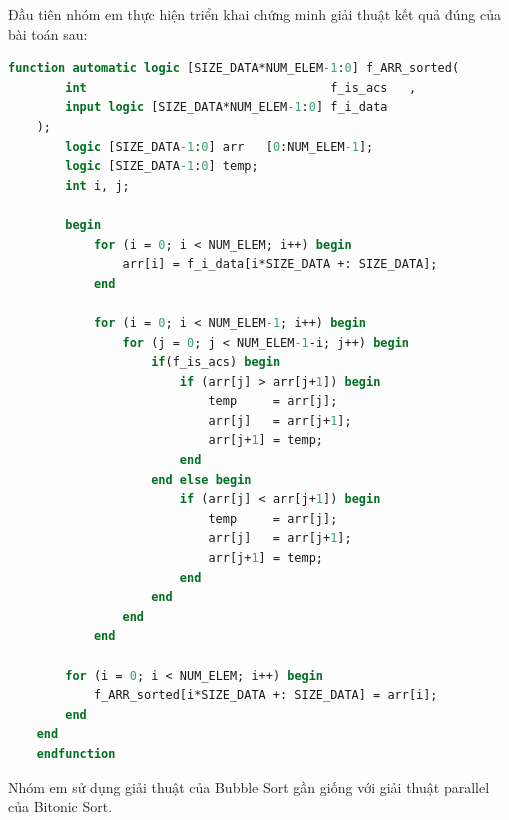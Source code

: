 
Đầu tiên nhóm em thực hiện triển khai chứng minh giải thuật kết quả đúng của bài toán sau:

\begin{lstlisting}[style=StyleCode, language=SystemVerilog, caption={Giải thuật chứng minh bộ Bitonic Sort 8 phần tử.}]
	function automatic logic [SIZE_DATA*NUM_ELEM-1:0] f_ARR_sorted(
		int                                  f_is_acs   ,
		input logic [SIZE_DATA*NUM_ELEM-1:0] f_i_data
	);
		logic [SIZE_DATA-1:0] arr   [0:NUM_ELEM-1];
		logic [SIZE_DATA-1:0] temp;
		int i, j;
	
		begin
			for (i = 0; i < NUM_ELEM; i++) begin
				arr[i] = f_i_data[i*SIZE_DATA +: SIZE_DATA];
			end
			
			for (i = 0; i < NUM_ELEM-1; i++) begin
				for (j = 0; j < NUM_ELEM-1-i; j++) begin
					if(f_is_acs) begin
						if (arr[j] > arr[j+1]) begin
							temp     = arr[j];
							arr[j]   = arr[j+1];
							arr[j+1] = temp;
						end 
					end else begin
						if (arr[j] < arr[j+1]) begin
							temp     = arr[j];
							arr[j]   = arr[j+1];
							arr[j+1] = temp;
						end
					end
				end
			end
	
		for (i = 0; i < NUM_ELEM; i++) begin
			f_ARR_sorted[i*SIZE_DATA +: SIZE_DATA] = arr[i];
		end
	end
	endfunction
\end{lstlisting}

Nhóm em sử dụng giải thuật của Bubble Sort gần giống với giải thuật parallel của Bitonic Sort.